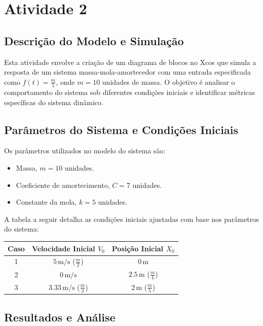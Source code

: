 \section{Atividade 2}

\subsection{Descrição do Modelo e Simulação}
Esta atividade envolve a criação de um diagrama de blocos no Xcos que simula a resposta de um sistema massa-mola-amortecedor com uma entrada especificada como \( f(t) = \frac{m}{5} \), onde \( m = 10 \) unidades de massa. O objetivo é analisar o comportamento do sistema sob diferentes condições iniciais e identificar métricas específicas do sistema dinâmico.

\subsection{Parâmetros do Sistema e Condições Iniciais}
Os parâmetros utilizados no modelo do sistema são:
\begin{itemize}
    \item Massa, \( m = 10 \) unidades.
    \item Coeficiente de amortecimento, \( C = 7 \) unidades.
    \item Constante da mola, \( k = 5 \) unidades.
\end{itemize}

A tabela a seguir detalha as condições iniciais ajustadas com base nos parâmetros do sistema:
\begin{center}
\begin{tabular}{|c|c|c|}
\hline
Caso & Velocidade Inicial \( V_0 \) & Posição Inicial \( X_0 \) \\
\hline
1 & \( 5 \, \text{m/s} \) (\( \frac{m}{2} \)) & \( 0 \, \text{m} \) \\
2 & \( 0 \, \text{m/s} \) & \( 2.5 \, \text{m} \) (\( \frac{m}{4} \)) \\
3 & \( 3.33 \, \text{m/s} \) (\( \frac{m}{3} \)) & \( 2 \, \text{m} \) (\( \frac{m}{5} \)) \\
\hline
\end{tabular}
\end{center}

\subsection{Resultados e Análise}
